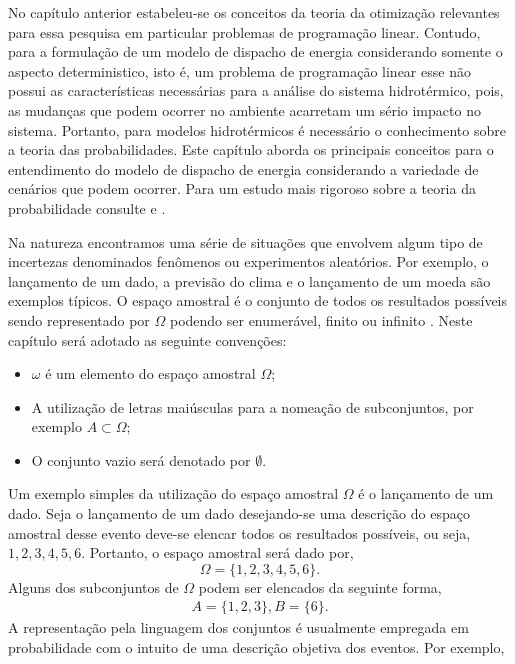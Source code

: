 No cap\'itulo anterior estabeleu-se os conceitos da teoria da otimiza\c c\~ao relevantes para essa pesquisa em
particular problemas de programa\c c\~ao linear. Contudo, para a formula\c{c}\~{a}o de um modelo de dispacho
de energia considerando somente o aspecto deterministico, isto \'e, um problema de programa\c c\~ao linear
esse n\~ao possui as caracter\'isticas necess\'arias para a an\'alise do sistema hidrot\'ermico, pois, as
mudan\c{c}as que podem ocorrer no ambiente acarretam um s\'{e}rio impacto no sistema. Portanto, para modelos
hidrot\'{e}rmicos \'{e} necess\'{a}rio o conhecimento sobre a teoria das probabilidades. Este cap\'itulo
aborda os principais conceitos para o entendimento do modelo de dispacho de energia considerando a variedade
de cen\'{a}rios que podem ocorrer. Para um estudo mais rigoroso sobre a teoria da probabilidade consulte
\cite{james} e \cite{magalhaes}.  \par Na natureza encontramos uma s\'{e}rie de situa\c{c}\~{o}es que envolvem
algum tipo de incertezas denominados fen\^{o}menos ou experimentos aleat\'{o}rios. Por exemplo, o
lan\c{c}amento de um dado, a previs\~{a}o do clima e o lan\c camento de um moeda s\~ao exemplos t\'ipicos.  O
espa\c{c}o amostral \'{e} o conjunto de todos os resultados poss\'{i}veis sendo representado  por $\Omega$
podendo ser enumer\'{a}vel, finito ou infinito \cite{magalhaes}. Neste cap\'itulo ser\'a adotado as seguinte
conven\c c\~oes: 
	\begin{itemize} \item $\omega$ \'e um elemento do espa\c co amostral $\Omega$;
		\item A utiliza\c c\~ao de letras mai\'usculas para a nomea\c c\~ao de subconjuntos, por exemplo $A \subset 
		\Omega$; 
		\item  O conjunto vazio ser\'a denotado por $\emptyset$.
	\end{itemize} Um exemplo simples da
utiliza\c c\~ao do espa\c co amostral $\Omega$ \'e o lan\c camento de um dado. Seja o lan\c{c}amento de um
dado desejando-se uma descri\c c\~ao do espa\c co amostral desse evento deve-se elencar todos os resultados
poss\'iveis, ou seja, $ 1, 2, 3, 4, 5, 6$. Portanto, o espa\c{c}o amostral ser\'{a} dado por, $$\Omega =
\{1,2,3,4,5,6\}.$$ Alguns dos subconjuntos de $\Omega$ podem ser elencados da seguinte forma, 
	\begin{align*} 
		A = \{1,2,3\}, B = \{6\}.
	\end{align*}
A representa\c{c}\~{a}o pela linguagem dos conjuntos \'e usualmente
empregada em probabilidade com o intuito de uma descri\c c\~ao  objetiva dos eventos. Por exemplo,
